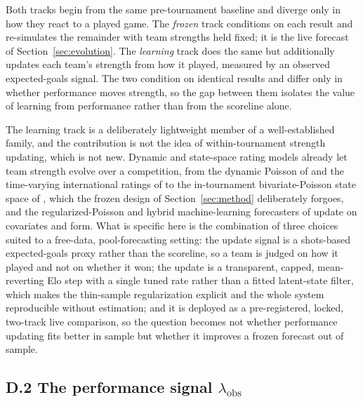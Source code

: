 \documentclass[11pt,letterpaper]{article}
\begin{document}
Both tracks begin from the same pre-tournament baseline and diverge only in how they react to a played game. The \emph{frozen} track conditions on each result and re-simulates the remainder with team strengths held fixed; it is the live forecast of Section~\ref{sec:evolution}. The \emph{learning} track does the same but additionally updates each team's strength from how it played, measured by an observed expected-goals signal. The two condition on identical results and differ only in whether performance moves strength, so the gap between them isolates the value of learning from performance rather than from the scoreline alone.

The learning track is a deliberately lightweight member of a well-established family, and the contribution is not the idea of within-tournament strength updating, which is not new. Dynamic and state-space rating models already let team strength evolve over a competition, from the dynamic Poisson of \citet{rue2000} and the time-varying international ratings of \citet{bakermchale2015} to the in-tournament bivariate-Poisson state space of \citet{koopmanlit2015}, which the frozen design of Section~\ref{sec:method} deliberately forgoes, and the regularized-Poisson and hybrid machine-learning forecasters of \citet{groll2015, groll2019} update on covariates and form. What is specific here is the combination of three choices suited to a free-data, pool-forecasting setting: the update signal is a shots-based expected-goals proxy rather than the scoreline, so a team is judged on how it played and not on whether it won; the update is a transparent, capped, mean-reverting Elo step with a single tuned rate rather than a fitted latent-state filter, which makes the thin-sample regularization explicit and the whole system reproducible without estimation; and it is deployed as a pre-registered, locked, two-track live comparison, so the question becomes not whether performance updating fits better in sample but whether it improves a frozen forecast out of sample.

\subsection*{D.2 \quad The performance signal $\lambda_{\text{obs}}$}
\end{document}
